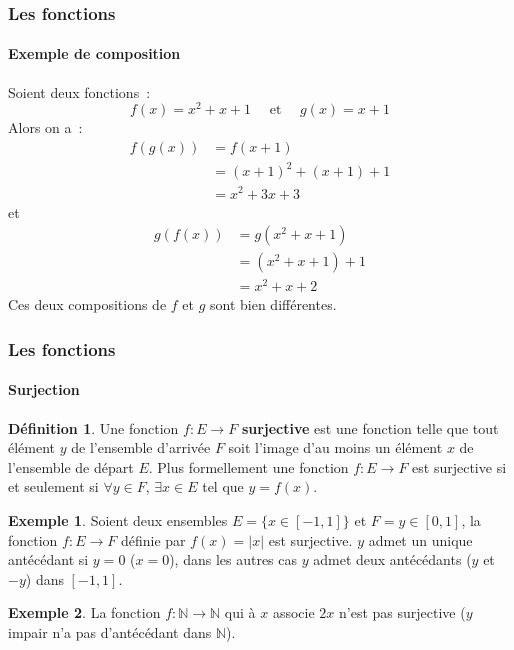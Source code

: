 \documentclass[10pt,notheorems]{beamer}
\theoremstyle{plain}
\theoremstyle{definition} %
\newtheorem{definition}{Définition}
\newtheorem{example}{Exemple}
\begin{document}
\begin{frame}
  \frametitle{Les fonctions}
  \framesubtitle{Exemple de composition}
  \hypertarget{slide_fonctions_composition_exemple}{}

  Soient deux fonctions~:
  \[
    f(x) = x^2+x+1 \quad\text{ et }\quad g(x) = x+1
  \]
  Alors on a~:
  \[
    \begin{split}
      f(g(x)) &= f(x+1)\\
      &= (x+1)^2+(x+1)+1\\
      &= x^2+3x+3
    \end{split}
  \]
  et
  \[
    \begin{split}
      g(f(x)) &= g(x^2+x+1)\\
      &= (x^2+x+1)+1\\
      &= x^2+x+2
    \end{split}
  \]
  Ces deux compositions de $f$ et $g$ sont bien différentes.

\end{frame}


\begin{frame}
  \frametitle{Les fonctions}
  \framesubtitle{Surjection}
  \hypertarget{slide_fonctions_surjection}{}

  \begin{definition}\label{def:surjection} Une fonction $f: E\longrightarrow F$ \textbf{surjective} est une fonction telle que tout élément $y$ de l'ensemble d'arrivée $F$ soit l'image d'au moins un élément $x$ de l'ensemble de départ $E$. Plus formellement une fonction $f: E\longrightarrow F$ est surjective si et seulement si $\forall y\in F$, $\exists x\in E$ tel que $y=f(x)$.
  \end{definition}

  \begin{example}\label{ex:surjection_1}
    Soient deux ensembles $E = \{x\in [-1,1]\}$ et $F = {y\in[0,1]}$, la fonction $f: E\longrightarrow F$ définie par $f(x) = |x|$ est surjective. $y$ admet un unique antécédant si $y=0$ ($x=0$), dans les autres cas $y$ admet deux antécédants ($y$ et $-y$) dans $[-1,1]$.
  \end{example}

  \begin{example}\label{ex:surjection_2}
    La fonction $f: \mathbb N \longrightarrow \mathbb N$ qui à $x$ associe $2x$ n'est pas surjective ($y$ impair n'a pas d'antécédant dans $\mathbb N$).
  \end{example}

\end{frame}
\end{document}
